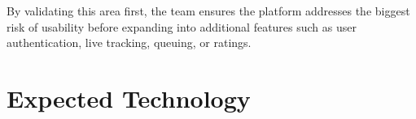 \documentclass{article}
\begin{document}
By validating this area first, the team ensures the platform addresses the biggest risk of usability before expanding into additional features such as user authentication, live tracking, queuing, or ratings.


\section{Expected Technology}





\end{document}
